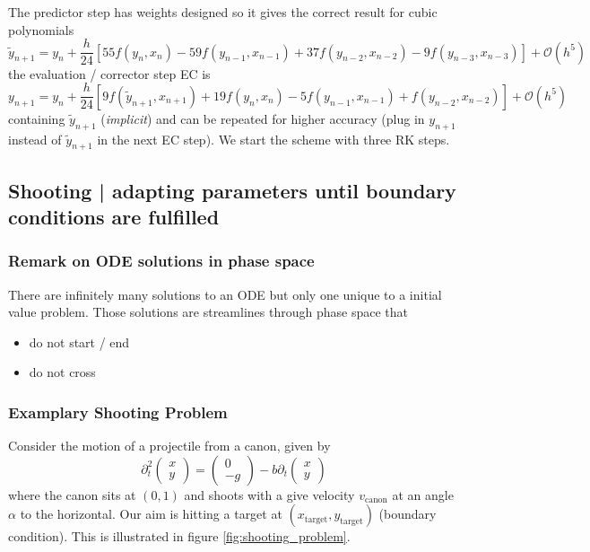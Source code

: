 The predictor step has weights designed so it gives the correct result for cubic polynomials
\begin{equation}
  \tilde{y}_{n+1} = y_n + \frac{h}{24} \left[ 55 f(y_n,x_n) - 59 f(y_{n-1},x_{n-1}) + 37 f(y_{n-2},x_{n-2}) - 9 f(y_{n-3},x_{n-3}) \right] + \mathcal{O}(h^5)
\end{equation}
the evaluation / corrector step EC is
\begin{equation}
  y_{n+1} = y_n + \frac{h}{24} \left[ 9 f(\tilde{y}_{n+1},x_{n+1}) + 19 f(y_{n},x_{n}) - 5 f(y_{n-1},x_{n-1}) + f(y_{n-2},x_{n-2}) \right] + \mathcal{O}(h^5)
\end{equation}
containing $\tilde{y}_{n+1}$ (\textit{implicit}) and can be repeated for higher accuracy (plug in $y_{n+1}$ instead of $\tilde{y}_{n+1}$ in the next EC step). We start the scheme with three RK steps.

\subsection{Shooting | adapting parameters until boundary conditions are fulfilled}
\subsubsection{Remark on ODE solutions in phase space}
There are infinitely many solutions to an ODE but only one unique to a initial value problem. Those
solutions are streamlines through phase space that
\begin{itemize}
  \item do not start / end
  \item do not cross
\end{itemize}
\subsubsection{Examplary Shooting Problem}
Consider the motion of a projectile from a canon, given by
\begin{equation}
  \partial_t^2 \begin{pmatrix} x \\ y \end{pmatrix}= \begin{pmatrix} 0 \\ -g \end{pmatrix} - b \partial_t \begin{pmatrix} x \\ y \end{pmatrix}
\end{equation}
where the canon sits at $(0,1)$ and shoots with a give velocity $v_{\text{canon}}$ at an angle $\alpha$ to the horizontal. Our
aim is hitting a target at $(x_{\text{target}},y_{\text{target}})$ (boundary condition). This is illustrated in figure \ref{fig:shooting_problem}.

